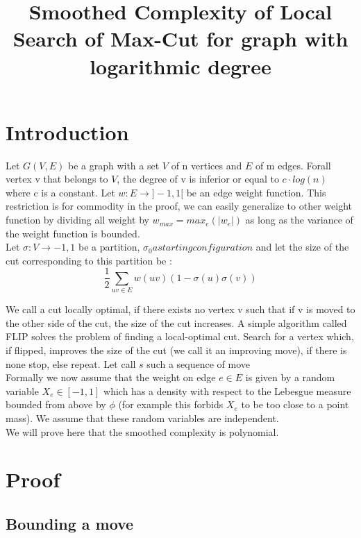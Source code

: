 \documentclass[12pt]{article}
\title{Smoothed Complexity of Local Search of Max-Cut for graph with logarithmic degree}
\begin{document}
\maketitle

\section{Introduction}

Let $G(V,E)$ be a graph with a set $V$ of n vertices and $E$ of m edges. Forall vertex v that belongs to $V$, the degree of v is inferior or equal to $c \cdot log(n)$ where c is a constant. Let $ w : E \rightarrow ]-1, 1[$ be an edge weight function. This restriction is for commodity in the proof, we can easily generalize to other weight function by dividing all weight by $w_{max} = max_e (|w_e|)$ as long as the variance of the weight function is bounded. \\
Let $\sigma : V \rightarrow {-1,1}$ be a partition, $\sigma_0 a starting configuration$ and let the size of the cut corresponding to this partition be :
\begin{equation*}
\dfrac{1}{2}\sum_{uv \in E} {w(uv)(1 - \sigma(u)\sigma(v)) }
\end{equation*}

We call a cut locally optimal, if there exists no vertex v such that if v is moved to the other side of the cut, the size of the cut increases. 
A simple algorithm called FLIP solves the problem of finding a local-optimal cut. Search for a vertex which, if flipped, improves the size of the cut (we call it an improving move), if there is none stop, else repeat. Let call $s$ such a sequence of move \\

Formally we now assume that the weight on edge $e \in E$ is given by a random variable $X_e \in [-1,1]$ which has a density with respect to the Lebesgue measure bounded from above by $\phi$ (for example this forbids $X_e$ to be too close to a point mass). We assume that these random variables are independent.\\
We will prove here that the smoothed complexity is polynomial. 


\section{Proof}
\subsection{Bounding a move}
\end{document}
